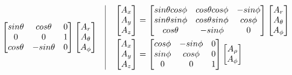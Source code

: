 \documentclass[10pt,letterpaper]{report}
\begin{document}
\begin{equation*}
\begin{split}
\begin{bmatrix}
          sin \theta  & cos \theta  & 0 \\
          0           & 0           & 1 \\
          cos \theta  & -sin \theta & 0
          \end{bmatrix} 
          \begin{bmatrix}
            A_r \\
            A_{\theta} \\
            A_{\phi}
          \end{bmatrix} 
      \end{split}
      \quad \vline \quad            
      \begin{split}
        &\begin{bmatrix}
            A_x \\
            A_y \\
            A_z
          \end{bmatrix}
          =
          \begin{bmatrix}
            sin \theta cos \phi  & cos \theta cos \phi & -sin \phi \\
            sin \theta sin \phi  & cos \theta sin \phi & cos \phi \\
            cos \theta           & -sin \phi           & 0
          \end{bmatrix} 
          \begin{bmatrix}
            A_r \\
            A_{\theta} \\
            A_{\phi}
          \end{bmatrix} \\
        &\begin{bmatrix}
           A_x \\
           A_y \\
           A_z
         \end{bmatrix}
         =
         \begin{bmatrix}
           cos \phi & -sin \phi & 0 \\
           sin \phi &  cos \phi & 0 \\
           0        &  0        & 1
         \end{bmatrix} 
         \begin{bmatrix}
           A_{\rho} \\
           A_{\phi} \\

\end{bmatrix}
\end{split}
\end{equation*}
\end{document}
